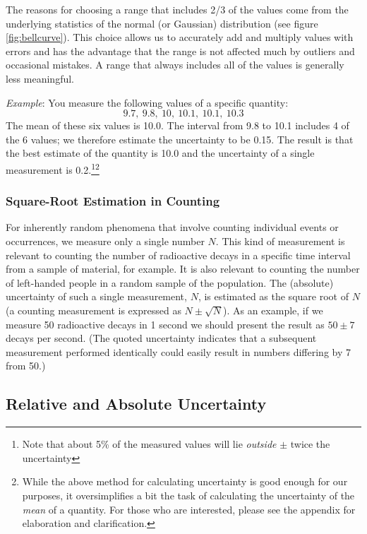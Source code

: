 The reasons for choosing a range that includes 2/3 of the values come from the underlying statistics of the normal (or Gaussian) distribution (see figure \ref{fig:bellcurve}). This choice allows us to accurately add and multiply values with errors and has the advantage that the range is not affected much by outliers and occasional mistakes. A range that always includes all of the values is generally less meaningful. \myskip

\emph{Example}: You measure the following values of a specific quantity:
\begin{equation*}
    9.7,\:9.8,\:10,\:10.1,\:10.1,\:10.3
\end{equation*}
The mean of these six values is 10.0. The interval from 9.8 to 10.1 includes 4 of the 6 values; we therefore estimate the uncertainty to be 0.15. The result is that the best estimate of the quantity is 10.0 and the uncertainty of a single measurement is 0.2.\footnote{Note that about 5\% of the measured values will lie \emph{outside} $\pm$ twice the uncertainty}\footnote{While the above method for calculating uncertainty is good enough for our purposes, it oversimplifies a bit the task of calculating the uncertainty of the \emph{mean} of a quantity.  For those who are interested, please see the appendix for elaboration and clarification. }

\subsubsection{Square-Root Estimation in Counting}

For inherently random phenomena that involve counting individual events or occurrences, we measure only a single number $N$. This kind of measurement is relevant to counting the number of radioactive decays in a specific time interval from a sample of material, for example. It is also relevant to counting the number of left-handed people in a random sample of the population. The (absolute) uncertainty of such a single measurement, $N$, is estimated as the square root of $N$ (a counting measurement is expressed as $N \pm \sqrt{N}$). As an example, if we measure 50 radioactive decays in 1 second we should present the result as $50\pm 7$ decays per second. (The quoted uncertainty indicates that a subsequent measurement performed identically could easily result in numbers differing by 7 from 50.)

\subsection{Relative and Absolute Uncertainty}

